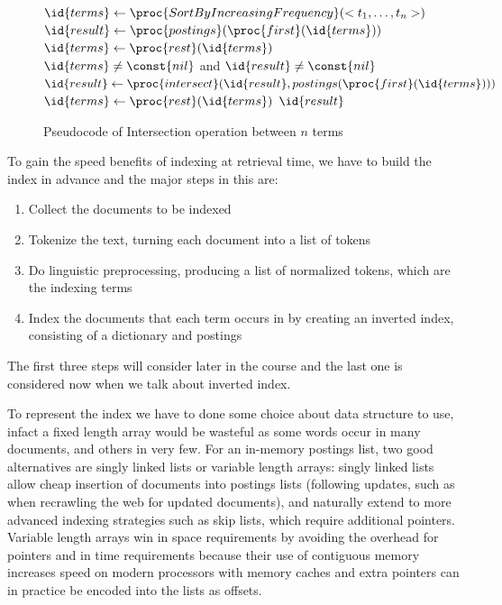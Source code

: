 \begin{figure}
    \caption{Pseudocode of Intersection operation between $n$ terms}
    \label{alg:intersectionTerms}
    \begin{codebox}
	    \li $\id{terms} \gets \proc{SortByIncreasingFrequency}(<t_1, \dots, t_n>)$
	    \li $\id{result} \gets \proc{postings} (\proc{first}(\id{terms}))$
	    \li $\id{terms} \gets \proc{rest} (\id{terms})$
	    \li \While $\id{terms} \neq \const{nil}$ and $\id{result} \neq \const{nil}$
	    	\Do
	    \li $\id{result} \gets \proc{intersect} (\id{result}, postings(\proc{first} (\id{terms})))$
	    \li $\id{terms} \gets \proc{rest} (\id{terms})$
	        \End
	    \li \Return $\id{result}$
    \end{codebox}
\end{figure}
To gain the speed benefits of indexing at retrieval time, we have to build the index in advance
and the major steps in this are:
\begin{enumerate}
    \item Collect the documents to be indexed
    \item Tokenize the text, turning each document into a list of tokens
    \item Do linguistic preprocessing, producing a list of normalized tokens, which are the indexing terms
    \item Index the documents that each term occurs in by creating an inverted index,
          consisting of a dictionary and postings
\end{enumerate}
The first three steps will consider later in the course and the last one is considered now when we talk about 
inverted index.

To represent the index we have to done some choice about data structure to use, infact 
a fixed length array would be wasteful as some words occur in many documents, and others in very few.\newline
For an in-memory postings list, two good alternatives are singly linked lists or variable length arrays:
singly linked lists allow cheap insertion of documents into postings lists (following updates,
such as when recrawling the web for updated documents), and naturally extend to more advanced indexing strategies
such as skip lists, which require additional pointers.\newline
Variable length arrays win in space requirements by avoiding the overhead for pointers and in
time requirements because their use of contiguous memory increases speed on modern processors with memory caches
and extra pointers can in practice be encoded into the lists as offsets.

